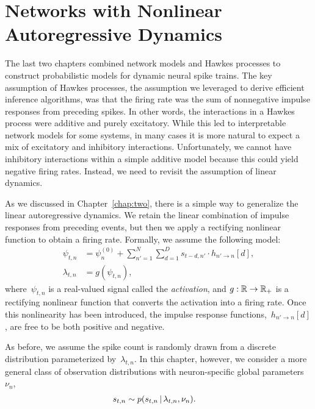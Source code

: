 
\chapter{Networks with Nonlinear Autoregressive Dynamics}
\label{chap:five}

The last two chapters combined network models and Hawkes processes to
construct probabilistic models for dynamic neural spike trains. The
key assumption of Hawkes processes, the assumption we leveraged to
derive efficient inference algorithms, was that the firing rate was the
sum of nonnegative impulse responses from preceding spikes. In other
words, the interactions in a Hawkes process were additive and purely
excitatory. While this led to interpretable network models for some
systems, in many cases it is more natural to expect a mix of
excitatory and inhibitory interactions. Unfortunately, we cannot have
inhibitory interactions within a simple additive model because this could
yield negative firing rates. Instead, we need to revisit the
assumption of linear dynamics.

As we discussed in Chapter~\ref{chap:two}, there is a simple way to
generalize the linear autoregressive dynamics. We retain the linear
combination of impulse responses from preceding events, but then we
apply a rectifying nonlinear function to obtain a firing rate.
Formally, we assume the following model:
\begin{align*}
  \psi_{t,n}
  &= \psi_{n}^{(0)} + \sum_{n'=1}^N \sum_{d=1}^{D} s_{t-d, n'} \cdot h_{n' \to n}[d], \\
  \lambda_{t,n} &= g(\psi_{t,n}),
\end{align*}
where~$\psi_{t,n}$ is a real-valued signal called the
\emph{activation}, and ${g: \mathbb{R} \to \mathbb{R}_+}$ is a rectifying
nonlinear function that converts the activation into a firing rate.
Once this nonlinearity has been introduced, the impulse response
functions,~$h_{n' \to n}[d]$, are free to be both positive and negative.

As before, we assume the spike count is randomly drawn from a discrete
distribution parameterized by~$\lambda_{t,n}$. In this chapter, however,
we consider a more general class of observation distributions with
neuron-specific global parameters~$\nu_n$,
\begin{align*}
  s_{t,n} &\sim p(s_{t,n} \,|\, \lambda_{t,n}, \nu_n).
\end{align*}

